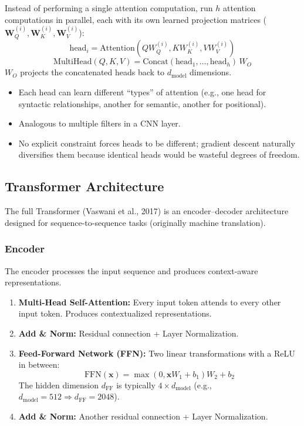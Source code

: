 \documentclass[11pt, a4paper]{article}
\begin{document}
\begin{defbox}
Instead of performing a single attention computation, run $h$ attention computations in parallel, each with its own learned projection matrices ($\mathbf{W}_Q^{(i)}, \mathbf{W}_K^{(i)}, \mathbf{W}_V^{(i)}$):
\[
\text{head}_i = \text{Attention}(Q W_Q^{(i)}, K W_K^{(i)}, V W_V^{(i)})
\]
\[
\text{MultiHead}(Q, K, V) = \text{Concat}(\text{head}_1, \ldots, \text{head}_h) \, W_O
\]
$W_O$ projects the concatenated heads back to $d_{\text{model}}$ dimensions.
\end{defbox}

\begin{itemize}[leftmargin=2em]
  \item Each head can learn different ``types'' of attention (e.g., one head for syntactic relationships, another for semantic, another for positional).
  \item Analogous to multiple filters in a CNN layer.
  \item No explicit constraint forces heads to be different; gradient descent naturally diversifies them because identical heads would be wasteful degrees of freedom.
\end{itemize}

\subsection{Transformer Architecture}

The full Transformer (Vaswani et al., 2017) is an encoder--decoder architecture designed for sequence-to-sequence tasks (originally machine translation).

\subsubsection{Encoder}

The encoder processes the input sequence and produces context-aware representations.

\begin{notebox}
\begin{enumerate}[leftmargin=1.5em]
  \item \textbf{Multi-Head Self-Attention:} Every input token attends to every other input token. Produces contextualized representations.
  \item \textbf{Add \& Norm:} Residual connection + Layer Normalization.
  \item \textbf{Feed-Forward Network (FFN):} Two linear transformations with a ReLU in between:
  \[
  \text{FFN}(\mathbf{x}) = \max(0, \mathbf{x}W_1 + b_1)W_2 + b_2
  \]
  The hidden dimension $d_{\text{FF}}$ is typically $4 \times d_{\text{model}}$ (e.g., $d_{\text{model}} = 512 \Rightarrow d_{\text{FF}} = 2048$).
  \item \textbf{Add \& Norm:} Another residual connection + Layer Normalization.
\end{enumerate}
\end{notebox}
\end{document}
